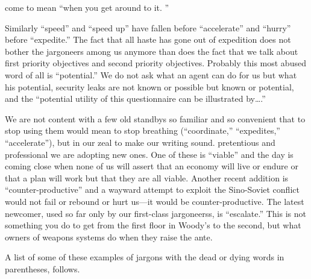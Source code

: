 \documentclass[
    oneside,
    11pt,
    draft
]{memoir}
\begin{document}
come to mean \enquote{when you get around to it. }

Similarly \enquote{speed} and \enquote{speed up} have fallen before \enquote{accelerate} and \enquote{hurry} before \enquote{expedite.} The fact that all haste has gone out of expedition does not bother the jargoneers among us anymore than does the fact that we talk about first  priority objectives and second priority objectives. Probably this most abused word of all is \enquote{potential.} We do not ask what an agent can do for us but what his potential, security leaks are not known or possible but known or potential, and the \enquote{potential utility of this questionnaire can be illustrated by\dots.}

We are not content with a few old standbys so familiar and so convenient that to stop using them would mean to stop breathing (\enquote{coordinate,} \enquote{expedites,} \enquote{accelerate}), but in our zeal to make our writing sound. pretentious and professional we are adopting new ones. One of these is \enquote{viable} and the day is coming close when none of us will assert that an economy will live or endure or that a plan will work but that they are all viable. Another recent addition is \enquote{counter-productive} and a wayward attempt to exploit the Sino-Soviet conflict would not fail or rebound or hurt us---it would be counter-productive. The latest newcomer, used so far only by our first-class jargoneerss, is \enquote{escalate.} This is not something you do to get from the first floor in Woody's to the second, but what owners of weapons systems do when they raise the ante.

A list of some of these examples of jargons with the dead or dying words in parentheses, follows.
\end{document}

